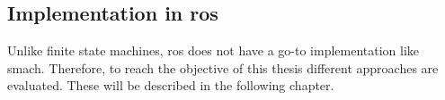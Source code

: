 \documentclass[\rootfolder/main.tex]{subfiles}
\begin{document}

\subsection{Implementation in \acrshort{ros}}

Unlike finite state machines, \acrshort{ros} does not have a go-to implementation like \acrshort{smach}.
Therefore, to reach the objective of this thesis different approaches are evaluated.
These will be described in the following chapter.
\end{document}
